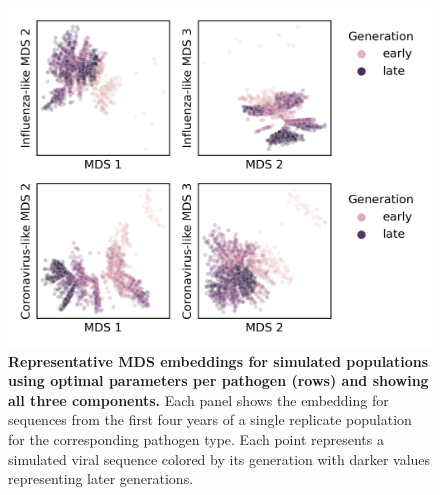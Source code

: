 \begin{figure}[!h]
\includegraphics[width=\columnwidth]{figures/simulated-populations-representative-mds-embeddings.png}
\caption{{\bf Representative MDS embeddings for simulated populations using optimal parameters per pathogen (rows) and showing all three components.}
  Each panel shows the embedding for sequences from the first four years of a single replicate population for the corresponding pathogen type.
  Each point represents a simulated viral sequence colored by its generation with darker values representing later generations.}\label{S_Fig_simulated_representative_mds_embeddings}
\end{figure}

